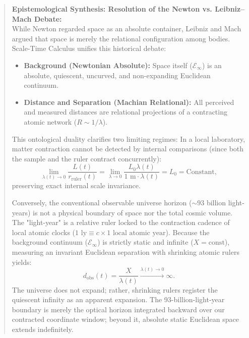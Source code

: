\documentclass[11pt,a4paper]{article}
\begin{document}
\begin{quote}
    \small
    \textbf{Epistemological Synthesis: Resolution of the Newton vs. Leibniz--Mach Debate:} \\
    While Newton regarded space as an absolute container, Leibniz and Mach argued that space is merely the relational configuration among bodies. Scale-Time Calculus unifies this historical debate:
    \begin{itemize}
        \item \textbf{Background (Newtonian Absolute):} Space itself ($\mathcal{E}_\infty$) is an absolute, quiescent, uncurved, and non-expanding Euclidean continuum.
        \item \textbf{Distance and Separation (Machian Relational):} All perceived and measured distances are relational projections of a contracting atomic network ($R \sim 1/\lambda$).
    \end{itemize}
    This ontological duality clarifies two limiting regimes: In a local laboratory, matter contraction cannot be detected by internal comparisons (since both the sample and the ruler contract concurrently):
    \begin{equation}
        \lim_{\lambda(t) \to 0} \frac{L(t)}{r_{\mathrm{ruler}}(t)} = \lim_{\lambda \to 0} \frac{L_0 \lambda(t)}{1\text{ m} \cdot \lambda(t)} = L_0 = \text{Constant},
        \label{eq:lhopital_oran_sc}
    \end{equation}
    preserving exact internal scale invariance.

    Conversely, the conventional observable universe horizon ($\sim 93$ billion light-years) is not a physical boundary of space nor the total cosmic volume. The "light-year" is a relative ruler locked to the contraction cadence of local atomic clocks ($1\text{ ly} \equiv c \times 1\text{ local atomic year}$). Because the background continuum ($\mathcal{E}_\infty$) is strictly static and infinite ($X = \text{const}$), measuring an invariant Euclidean separation with shrinking atomic rulers yields:
    \begin{equation}
        d_{\mathrm{obs}}(t) = \frac{X}{\lambda(t)} \xrightarrow{\lambda(t) \to 0} \infty.
        \label{eq:sonsuz_arka_plan_iraksama_sc}
    \end{equation}
    The universe does not expand; rather, shrinking rulers register the quiescent infinity as an apparent expansion. The 93-billion-light-year boundary is merely the optical horizon integrated backward over our contracted coordinate window; beyond it, absolute static Euclidean space extends indefinitely.
\end{quote}
\end{document}
